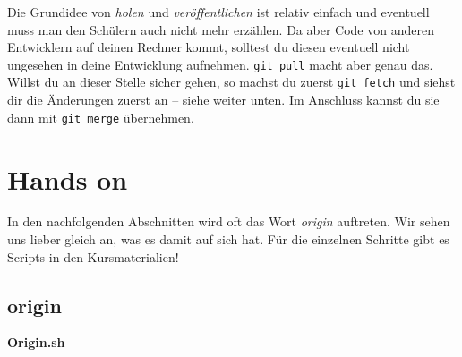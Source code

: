 \documentclass[
  letterpaper,
  DIV=11]{scrreprt}
\newenvironment{Shaded}{\begin{snugshade}}{\end{snugshade}}
\newcommand{\AttributeTok}[1]{\textcolor[rgb]{0.40,0.45,0.13}{#1}}
\newcommand{\BuiltInTok}[1]{\textcolor[rgb]{0.00,0.23,0.31}{#1}}
\newcommand{\CommentTok}[1]{\textcolor[rgb]{0.37,0.37,0.37}{#1}}
\newcommand{\ControlFlowTok}[1]{\textcolor[rgb]{0.00,0.23,0.31}{\textbf{#1}}}
\newcommand{\FunctionTok}[1]{\textcolor[rgb]{0.28,0.35,0.67}{#1}}
\newcommand{\NormalTok}[1]{\textcolor[rgb]{0.00,0.23,0.31}{#1}}
\newcommand{\OperatorTok}[1]{\textcolor[rgb]{0.37,0.37,0.37}{#1}}
\newcommand{\OtherTok}[1]{\textcolor[rgb]{0.00,0.23,0.31}{#1}}
\newcommand{\VariableTok}[1]{\textcolor[rgb]{0.07,0.07,0.07}{#1}}
\newcommand{\cmd}[1]{\texttt{#1}\xspace}
\begin{document}
Die Grundidee von \emph{holen} und \emph{veröffentlichen} ist relativ
einfach und eventuell muss man den Schülern auch nicht mehr erzählen. Da
aber Code von anderen Entwicklern auf deinen Rechner kommt, solltest du
diesen eventuell nicht ungesehen in deine Entwicklung aufnehmen.
\cmd{git pull} macht aber genau das.\\
Willst du an dieser Stelle sicher gehen, so machst du zuerst
\cmd{git fetch} und siehst dir die Änderungen zuerst an -- siehe weiter
unten. Im Anschluss kannst du sie dann mit \cmd{git merge} übernehmen.

\section{Hands on}\label{hands-on-1}

In den nachfolgenden Abschnitten wird oft das Wort \emph{origin}
auftreten. Wir sehen uns lieber gleich an, was es damit auf sich hat.
Für die einzelnen Schritte gibt es Scripts in den Kursmaterialien!

\subsection{origin}\label{origin}

\textbf{Origin.sh}

\begin{Shaded}
\end{Shaded}
\end{document}
